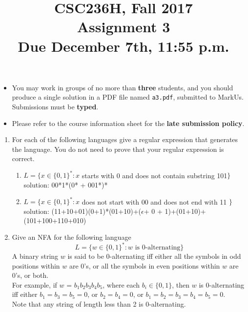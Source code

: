 \documentclass{article}
\title{CSC236H, Fall 2017\\
Assignment 3\\
Due December 7th, 11:55 p.m.}
\begin{document}
\maketitle
\vspace{-1.5cm}
\begin{itemize}
  \item You may work in groups of no more than \textbf{three} students, and you should
  produce a single solution in a PDF file named \texttt{a3.pdf}, submitted to {MarkUs}.
    Submissions must be \textbf{typed}.
  \item Please refer to the course information sheet for the \textbf{late submission policy}.
\end{itemize}
\vspace{1\baselineskip}

\begin{enumerate}
  \item For each of the following languages give a regular expression that generates the language. You do not need to prove that your regular expression is correct.
       \begin{enumerate}
       \item $L = \{x \in \{0, 1\}^*: x$ starts with 0 and does not contain substring 101$\}$
       \\ solution: 00*1*(0* + 001*)*
       \item $L = \{x \in \{0, 1\}^*: x$ does not start with 00 and does not end with 11 $\}$
       \\solution: (11+10+01)(0+1)*(01+10)+($\epsilon$+ 0 + 1)+(01+10)+(101+100+110+010)
       \end{enumerate}
    \item Give an NFA for the following language
      $$L = \{w\in\{0,1\}^\ast : w \mbox{ is 0-alternating}\}$$
      A binary string $w$ is said to be 0-alternating iff either all the symbols in odd positions within $w$ are 0's,
      or all the symbols in even positions within $w$ are 0's, or both.\\
      For example, if $w$ = $b_1b_2b_3b_4b_5$, where each $b_i \in \{0, 1\}$,
      then $w$ is 0-alternating iff either $b_1 = b_3 = b_5 = 0$, or $b_2 = b_4 = 0$,
      or $b_1 = b_2 = b_3 = b_4 = b_5 = 0$.\\
      Note that any string of length less than 2 is 0-alternating. \\


\end{enumerate}
\end{document}
